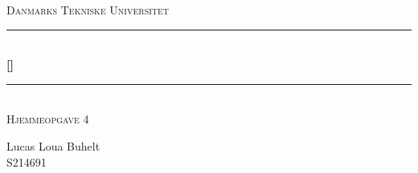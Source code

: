 \begin{titlepage} %
	\newcommand{\HRule}{\rule{\linewidth}{0.5mm}} %
	
	\center %
	   
	
	
	\textsc{\LARGE Danmarks Tekniske Universitet}\\[1.5cm] %
	
	
	
	
	\HRule\\[0.5cm]
	
	{\huge\bfseries [\Kursusenummer]  \Kursusnavn}\\[0.4cm] %

	\HRule\\[0.5cm]
	
	\textsc{\Large Hjemmeopgave 4}\\[1cm] %
	
    \begin{minipage}{0.3\textwidth}
		\begin{flushleft}
            \centering
            
            Lucas Loua Buhelt \\ 
            S214691 \\[0.8cm]
            

\end{flushleft}
\end{minipage}
\end{titlepage}
